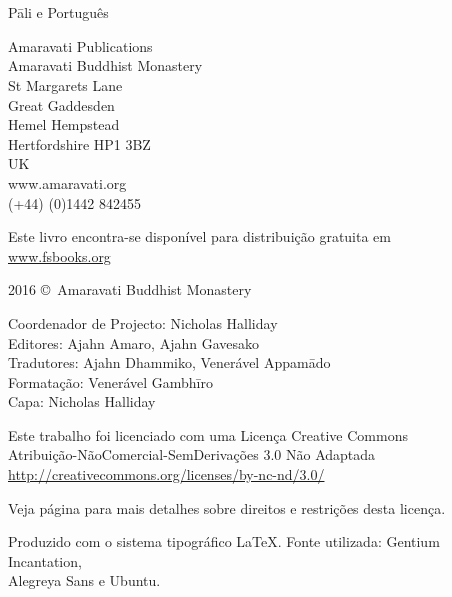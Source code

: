 
\thispagestyle{empty}

\enlargethispage{\baselineskip}

{\centering\small
\setlength{\parskip}{15pt}

{\normalsize
\thetitle\\
\thesubtitle\\
Pāli e Português}

Amaravati Publications\\
Amaravati Buddhist Monastery\\
St Margarets Lane\\
Great Gaddesden\\
Hemel Hempstead\\
Hertfordshire HP1 3BZ\\
UK\\
www.amaravati.org\\
(+44) (0)1442 842455

Este livro encontra-se disponível para distribuição gratuita em\\
\href{http://fsbooks.org/}{www.fsbooks.org}


2016 \copyright\ Amaravati Buddhist Monastery


Coordenador de Projecto: Nicholas Halliday\\
Editores: Ajahn Amaro, Ajahn Gavesako\\
Tradutores: Ajahn Dhammiko, Venerável Appamādo\\
Formatação: Venerável Gambhīro\\
Capa: Nicholas Halliday

\vfill

Este trabalho foi licenciado com uma Licença Creative Commons\\
Atribuição-NãoComercial-SemDerivações 3.0 Não Adaptada\\
\href{http://creativecommons.org/licenses/by-nc-nd/3.0/}{http://creativecommons.org/licenses/by-nc-nd/3.0/}

Veja página \pageref{copyright-details} para mais detalhes sobre direitos e restrições desta licença.

Produzido com o sistema tipográfico \LaTeX. Fonte utilizada: Gentium Incantation,\\
Alegreya Sans e Ubuntu.

\theEditionInfo


}
